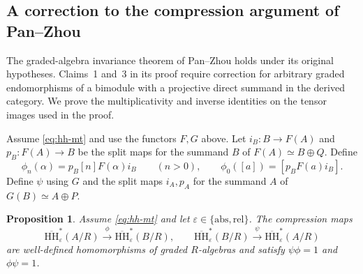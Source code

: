 \documentclass[12pt,a4paper,english,reqno]{amsart}
\numberwithin{equation}{section}
\theoremstyle{plain}
\newtheorem{proposition}[theorem]{Proposition}
\theoremstyle{definition}
\begin{document}
\subsection{A correction to the compression argument of Pan--Zhou}
\label{sec:pan-zhou-correction}

The graded-algebra invariance theorem of Pan--Zhou
\cite[Theorem~1.2]{PanZhou2010} holds under its original hypotheses.
Claims~1 and~3 in its proof require correction for arbitrary graded
endomorphisms of a bimodule with a projective direct summand in the
derived category. We prove the multiplicativity and inverse identities
on the tensor images used in the proof.

Assume \eqref{eq:hh-mt} and use the functors $F,G$ above. Let
$i_B:B\to F(A)$ and $p_B:F(A)\to B$ be the split maps for the
summand $B$ of $F(A)\simeq B\oplus Q$. Define
\[
 \phi_n(\alpha)=p_B[n]F(\alpha)i_B\qquad(n>0),
 \qquad
 \phi_0([a])=[p_BF(a)i_B].
\]
Define $\psi$ using $G$ and the split maps $i_A,p_A$ for the
summand $A$ of $G(B)\simeq A\oplus P$.

\begin{proposition}\label{prop:pan-zhou-compression}
Assume \eqref{eq:hh-mt} and let
$\varepsilon\in\{\mathrm{abs},\mathrm{rel}\}$. The compression maps
\[
 \overline{\mathrm{HH}}_{\varepsilon}^{*}(A/R)
 \xrightarrow{\ \phi\ }
 \overline{\mathrm{HH}}_{\varepsilon}^{*}(B/R),
 \qquad
 \overline{\mathrm{HH}}_{\varepsilon}^{*}(B/R)
 \xrightarrow{\ \psi\ }
 \overline{\mathrm{HH}}_{\varepsilon}^{*}(A/R)
\]
are well-defined homomorphisms of graded $R$-algebras and
satisfy $\psi\phi=1$ and $\phi\psi=1$.
\end{proposition}
\end{document}

